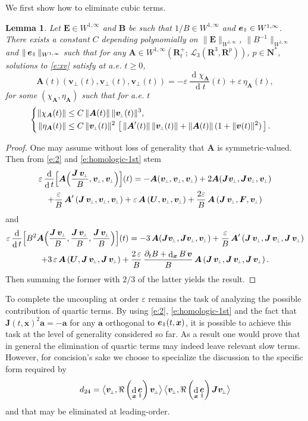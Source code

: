 \documentclass[10pt]{amsart}
\let\mathcal\mathscr
\newenvironment{splitcases}
{\begin{cases}\begin{aligned}}
{\end{aligned}\end{cases}}
\newcommand{\sperp}{{\scriptscriptstyle\perp}}
\newcommand{\blangle}{\bigl\langle}
\newcommand{\brangle}{\bigr\rangle}
\let\eps\varepsilon
\let\d\partial
\DeclareMathOperator\dD{d}\let\dd\dD
\theoremstyle{plain}
\newtheorem{lemma}[theorem]{Lemma}
\theoremstyle{definition}
\newcommand{\bl}{\begin{lemma}}
\newcommand{\el}{\end{lemma}}
\newcommand\R{\mathbf R}
\newcommand{\N}{\mathbf N}
\newcommand\bA{{\boldsymbol A}}
\newcommand\bB{{\boldsymbol B}}
\newcommand\bE{{\boldsymbol E}}
\newcommand\bF{{\boldsymbol F}}
\newcommand\bJ{{\boldsymbol J}}
\newcommand\bU{{\boldsymbol U}}
\newcommand\bfa{{\boldsymbol a}}
\newcommand\bfv{{\boldsymbol v}}
\newcommand\bfx{{\boldsymbol x}}
\newcommand\cL{{\mathcal L}}
\DeclareMathOperator{\beD}{\boldsymbol{e}}
\newcommand\eDpar{\beD_\mypar}
\newcommand\bvperp{\bfv_{\!\sperp}}
\newcommand{\mypar}{{\mkern3mu\vphantom{\perp}\vrule depth 0pt\mkern2mu\vrule depth 0pt\mkern3mu}}
\begin{document}
We first show how to eliminate cubic terms.
\bl
\label{3rd}
Let $\bE\in W^{1,\infty}$ and $\bB$ be such that $1/B\in W^{1,\infty}$
and $\eDpar\in W^{1,\infty}$. There exists a constant $C$ depending
polynomially on $\|\bE\|_{W^{1,\infty}}$, $\|B^{-1}\|_{W^{1,\infty}}$ and
$\|\eDpar\|_{W^{1,\infty}}$ such that for any $\bA\in
W^{1,\infty}\left(\R^+_t;\,\cL_3(\R^3,\R^p)\right)$, $p\in\N^*$,
solutions to \eqref{e:xv} satisfy at a.e. $t\geq 0$,
\[
\bA(t)(\bvperp(t),\bvperp(t),\bvperp(t))
=-\eps\,\frac{\dD\chi_\bA}{\dD t}(t)+\eps\,\eta_\bA(t),
\]
for some $(\chi_\bA,\eta_\bA)$ such that for a.e. $t$
\[
\begin{splitcases}
\|\chi_\bA(t)\|&\leq C\,\|\bA(t)\|\,\|\bvperp(t)\|^3,
\\
\|\eta_\bA(t)\|&\leq C\,\|\bvperp(t)\|^2\,\left[\,\|\bA'(t)\|\,\|\bvperp(t)\|
+\|\bA(t)\|\,(1+\|\bfv(t)\|^2)\,\right].
\end{splitcases}
\]
\el
\begin{proof}
One may assume without loss of generality that $\bA$ is symmetric-valued. Then from \eqref{e:2} and \eqref{e:homologic-1st} stem
\begin{multline*}
\eps\,\frac{\dD}{\dD t}\Bigl[\bA\Bigl(\frac{\bJ\,\bvperp}{B},\bvperp,\bvperp\Bigr)\Bigr](t)
=-\bA(\bvperp,\bvperp,\bvperp)+2\bA(\bJ\bvperp,\bJ\bvperp,\bvperp)
\\+\frac{\eps}{B}\,\bA'\left(\bJ\,\bvperp,\bvperp,\bvperp\right)
+\eps\,\bA\left(\bU,\bvperp,\bvperp\right)+\frac{2\eps}{B}\,\bA\left(\bJ\,\bvperp,\bF,\bvperp\right)
\end{multline*}
and
\begin{multline*}
\eps\,\frac{\dD}{\dD t}\Bigl[ B^2
\bA\Bigl(\frac{\bJ\,\bvperp}{B},\frac{\bJ\,\bvperp}{B},\frac{\bJ\,\bvperp}{B}\Bigr)\Bigr](t)=-3\,\bA(\bJ\bvperp,\bJ\bvperp,\bvperp)
+\frac{\eps}{B}\,\bA'\left(\bJ\,\bvperp,\bJ\,\bvperp,\bJ\,\bvperp\right)
\\
+3\,\eps\,\bA\left(\bU,\bJ\,\bvperp,\bJ\,\bvperp\right)
+\frac{2\,\eps}{B}\,\frac{\d_tB+\dD_\bfx B\,\bfv}{B}\,\bA\left(\bJ\,\bvperp,\bJ\,\bvperp,\bJ\,\bvperp\right).
\end{multline*}
Then summing the former with $2/3$ of the latter yields the result.
\end{proof}

To complete the uncoupling at order $\eps$ remains the task of analyzing the possible contribution of quartic terms. By using \eqref{e:2}, \eqref{e:homologic-1st} and the fact that $\bJ(t,\bfx)^2\bfa=-\bfa$ for any $\bfa$ orthogonal to $\eDpar(t,\bfx)$, it is possible to achieve this task at the level of generality considered so far. As a result one would prove that in general the elimination of quartic terms may indeed leave relevant slow terms. However, for concision's sake we choose to specialize the discussion to the specific form required by
\[
d_{24}=\blangle \bvperp ,
\Re\left(\dD_{\bfx}\eDpar\right)\bvperp \brangle\,\blangle \bvperp,
\Re\left(\dD_\bfx \eDpar\right)\bJ\bvperp\brangle
\]
and that may be eliminated at leading-order.
\end{document}
